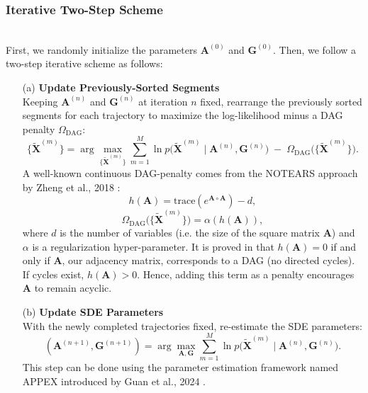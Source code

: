 \documentclass[a4paper, 11pt]{article}
\begin{document}
\begin{sloppypar}
\subsubsection{Iterative Two-Step Scheme} \mbox{}\\
First, we randomly initialize the parameters
$\mathbf{A}^{(0)}$ and $\mathbf{G}^{(0)}$. Then, we follow a two-step
iterative scheme as follows:
\begin{enumerate}
  \item[(a)] \textbf{Update Previously-Sorted Segments} \\
    Keeping $\mathbf{A}^{(n)}$ and $\mathbf{G}^{(n)}$ at iteration $n$ fixed, rearrange the
    previously sorted segments for each trajectory to maximize the log-likelihood minus a
    DAG penalty $\Omega_{\mathrm{DAG}}$:
    \[
    \{\widetilde{\mathbf{X}}^{(m)}\}
    = 
    \arg\max_{\{\widetilde{\mathbf{X}}^{(m)}\}}
    \sum_{m=1}^M
    \ln p\bigl(\widetilde{\mathbf{X}}^{(m)} \mid \mathbf{A}^{(n)}, \mathbf{G}^{(n)}\bigr)
    \;-\; 
    \Omega_{\mathrm{DAG}}\bigl(\{\widetilde{\mathbf{X}}^{(m)}\}\bigr).
    \]
    A well-known continuous DAG-penalty comes from the NOTEARS approach by
    Zheng et al., 2018 \cite{zheng2018dagstearscontinuousoptimization}:
    \[
    h(\mathbf{A})
    = \text{trace}(e^{\mathbf{A} \circ \mathbf{A}})-d,
    \]
    \[
    \Omega_{\mathrm{DAG}}\bigl(\{\widetilde{\mathbf{X}}^{(m)}\}\bigr)
    = \alpha (h(\mathbf{A})),
    \]
    where $d$ is the number of variables (i.e. the size of the square matrix
    $\mathbf{A}$) and $\alpha$ is a regularization hyper-parameter.
    It is proved in \cite{zheng2018dagstearscontinuousoptimization} that
    $h(\mathbf{A}) = 0$ if and only if $\mathbf{A}$,
    our adjacency matrix, corresponds to a DAG (no directed cycles). If cycles exist,
    $h(\mathbf{A}) > 0$. Hence, adding this term as a penalty encourages $\mathbf{A}$
    to remain acyclic.
  \item[(b)] \textbf{Update SDE Parameters} \\
    With the newly completed trajectories fixed, re-estimate the SDE parameters:
    \[
    (\mathbf{A}^{(n+1)}, \mathbf{G}^{(n+1)}) 
    = 
    \arg\max_{\mathbf{A}, \mathbf{G}}
    \sum_{m=1}^M
    \ln p\bigl(\widetilde{\mathbf{X}}^{(m)} \mid \mathbf{A}^{(n)}, \mathbf{G}^{(n)}\bigr).
    \]
    This step can be done using the parameter estimation framework named APPEX introduced
    by Guan et al., 2024 \cite{guan2024identifyingdriftdiffusioncausal}.
  \end{enumerate}


\end{sloppypar}
\end{document}
